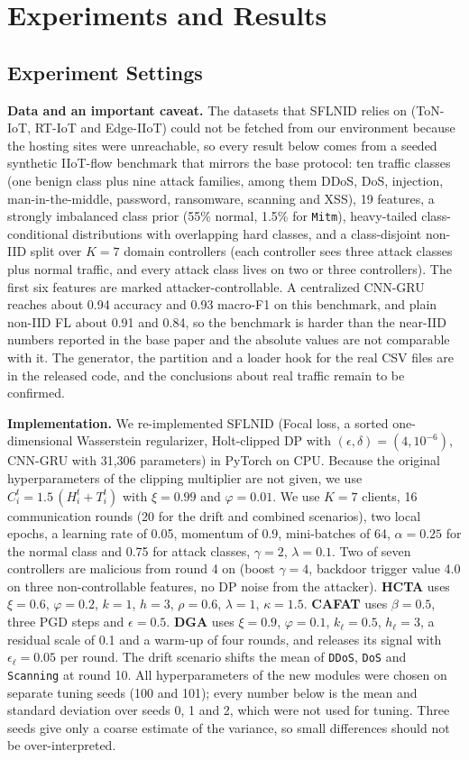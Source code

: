 \documentclass[journal]{IEEEtran}
\begin{document}
\section{Experiments and Results}\label{sec:eval}
\subsection{Experiment Settings}
\textbf{Data and an important caveat.} The datasets that SFLNID relies on (ToN-IoT, RT-IoT and Edge-IIoT) could not be fetched from our environment because the hosting sites were unreachable, so every result below comes from a seeded synthetic IIoT-flow benchmark that mirrors the base protocol: ten traffic classes (one benign class plus nine attack families, among them DDoS, DoS, injection, man-in-the-middle, password, ransomware, scanning and XSS), 19 features, a strongly imbalanced class prior (55\% normal, 1.5\% for \texttt{Mitm}), heavy-tailed class-conditional distributions with overlapping hard classes, and a class-disjoint non-IID split over $K=7$ domain controllers (each controller sees three attack classes plus normal traffic, and every attack class lives on two or three controllers). The first six features are marked attacker-controllable. A centralized CNN-GRU reaches about 0.94 accuracy and 0.93 macro-F1 on this benchmark, and plain non-IID FL about 0.91 and 0.84, so the benchmark is harder than the near-IID numbers reported in the base paper and the absolute values are not comparable with it. The generator, the partition and a loader hook for the real CSV files are in the released code, and the conclusions about real traffic remain to be confirmed.

\textbf{Implementation.} We re-implemented SFLNID (Focal loss, a sorted one-dimensional Wasserstein regularizer, Holt-clipped DP with $(\epsilon,\delta)=(4,10^{-6})$, CNN-GRU with 31,306 parameters) in PyTorch on CPU. Because the original hyperparameters of the clipping multiplier are not given, we use $C_i^t=1.5\,(H_i^t+T_i^t)$ with $\xi=0.99$ and $\varphi=0.01$. We use $K=7$ clients, 16 communication rounds (20 for the drift and combined scenarios), two local epochs, a learning rate of 0.05, momentum of 0.9, mini-batches of 64, $\alpha=0.25$ for the normal class and 0.75 for attack classes, $\gamma=2$, $\lambda=0.1$. Two of seven controllers are malicious from round 4 on (boost $\gamma=4$, backdoor trigger value 4.0 on three non-controllable features, no DP noise from the attacker). \textbf{HCTA} uses $\xi=0.6$, $\varphi=0.2$, $k=1$, $h=3$, $\rho=0.6$, $\lambda=1$, $\kappa=1.5$. \textbf{CAFAT} uses $\beta=0.5$, three PGD steps and $\epsilon=0.5$. \textbf{DGA} uses $\xi=0.9$, $\varphi=0.1$, $k_\ell=0.5$, $h_\ell=3$, a residual scale of 0.1 and a warm-up of four rounds, and releases its signal with $\epsilon_\ell=0.05$ per round. The drift scenario shifts the mean of \texttt{DDoS}, \texttt{DoS} and \texttt{Scanning} at round 10. All hyperparameters of the new modules were chosen on separate tuning seeds (100 and 101); every number below is the mean and standard deviation over seeds 0, 1 and 2, which were not used for tuning. Three seeds give only a coarse estimate of the variance, so small differences should not be over-interpreted.
\end{document}
